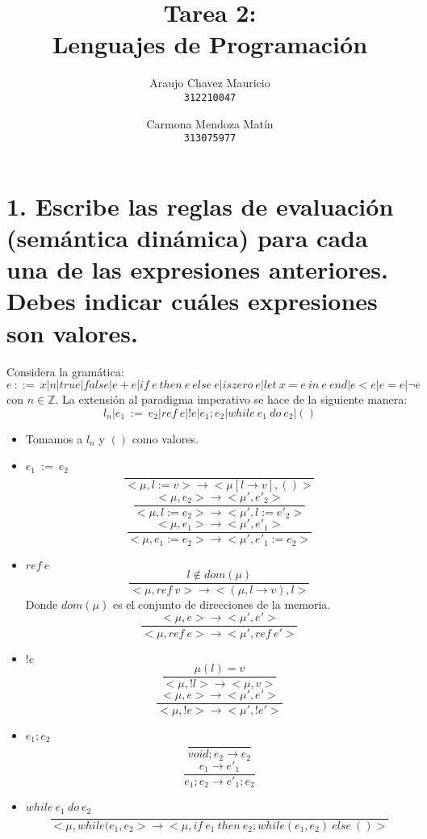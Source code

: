 \documentclass[11pt, a4paper]{report}
\begin{document}
\title{Tarea 2: \\Lenguajes de Programaci\'on}
\author{
  Araujo Chavez Mauricio\\
  \texttt{312210047}
  \and
  Carmona Mendoza Mat\'in\\
  \texttt{313075977}
}
\date{}
\maketitle

\section*{1. Escribe las reglas de evaluación (semántica dinámica) para cada una de las expresiones anteriores. Debes indicar cuáles expresiones son valores.}
Considera la gramática:
$$ e\ ::=\ x|n|true|false|e+e|if\ e\ then\ e\ else\ e|iszero\ e|let\ x=e\ in\ e\ end|e<e|e=e|\neg e  $$ 
con $n\in \mathbb{Z}$. La extensión al paradigma imperativo se hace de la siguiente manera:
$$ l_{n}|e_{1}\ :=\ e_{2}|ref\ e|!e|e_{1};e_{2}|while\ e_{1}\ do\ e_{2}|() $$

\begin{itemize}
	\item Tomamos a $l_{n}$ y $()$ como valores.
	\item $e_{1}\ :=\ e_{2}$
		  $$\frac{}{<\mu,l:=v> \rightarrow <\mu[l\rightarrow v],()>}$$
		  $$\frac{<\mu,e_{2}> \rightarrow <\mu',e'_{2}>}{<\mu,l := e_{2}> \rightarrow <\mu',l := e'_{2}>}$$
		  $$ \frac{<\mu,e_{1}> \rightarrow <\mu',e'_{1}>}{<\mu,e_{1} := e_{2}> \rightarrow <\mu',e'_{1}:=e_{2}>} $$
	\item $ref\ e$
		  $$\frac{l\notin dom(\mu)}{<\mu,ref\ v> \rightarrow <(\mu,l\rightarrow v),l>}$$
		  Donde $dom(\mu)$ es el conjunto de direcciones de la memoria.
		  $$\frac{<\mu,e> \rightarrow <\mu',e'>}{<\mu,ref\ e> \rightarrow <\mu',ref\ e'>}$$
	\item $!e$
		  $$\frac{\mu(l) = v}{<\mu,!l> \rightarrow <\mu,v>}$$
		  $$\frac{<\mu,e> \rightarrow <\mu',e'>}{<\mu,!e> \rightarrow <\mu',!e'>}$$
	\item $e_{1};e_{2}$
		  $$ \frac{}{void;e_{2} \rightarrow e_{2}} $$
		  $$ \frac{e_{1} \rightarrow e'_{1}}{e_{1};e_{2}\rightarrow e'_{1};e_{2}} $$
	\item $while\ e_{1}\ do\ e_{2}$
		  $$\frac{}{<\mu,while(e_{1},e_{2}> \rightarrow <\mu, if\ e_{1}\ then\ e_{2};while(e_{1},e_{2})\ else\ ()>}$$
\end{itemize}
\end{document}

